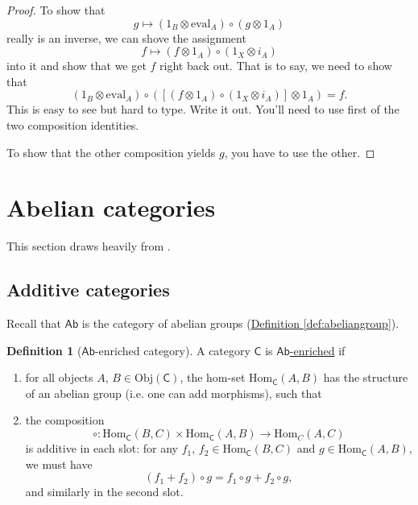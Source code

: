 \documentclass[a4paper]{report}
\newcommand{\defn}[1]{\ul{#1}}
\newcommand{\Obj}{\mathrm{Obj}}
\newcommand{\Hom}{\mathrm{Hom}}
\newcommand{\ev}{\mathrm{eval}}
\theoremstyle{definition}
\newtheorem{definition}{Definition}[section]
\theoremstyle{plain}
\theoremstyle{remark}
\begin{document}
\begin{proof}
  To show that 
  \begin{equation*}
    g \mapsto (1_{B} \otimes \ev_{A}) \circ (g \otimes 1_{A})
  \end{equation*}
  really is an inverse, we can shove the assignment
  \begin{equation*}
    f \mapsto (f \otimes 1_{A}) \circ (1_{X} \otimes i_{A})
  \end{equation*}
  into it and show that we get $f$ right back out. That is to say, we need to show that
  \begin{equation*}
    (1_{B} \otimes \ev_{A}) \circ (\left[ (f \otimes 1_{A}) \circ (1_{X} \otimes i_{A}) \right] \otimes 1_{A}) = f.
  \end{equation*}
  This is easy to see but hard to type. Write it out. You'll need to use first of the two composition identities. 

  To show that the other composition yields $g$, you have to use the other.
\end{proof} 

\section{Abelian categories} \label{sec:abeliancategories}
This section draws heavily from \cite{EGNO-tensor-categories}.
\subsection{Additive categories}
Recall that $\mathsf{Ab}$ is the category of abelian groups (\hyperref[def:abeliangroup]{Definition \ref*{def:abeliangroup}}).
\begin{definition}[$\mathsf{Ab}$-enriched category]
  \label{def:abenrichedcategory}
  A category $\mathsf{C}$ is \defn{$\mathsf{Ab}$-enriched} if 
  \begin{enumerate}
    \item for all objects $A$, $B \in \Obj(\mathsf{C})$, the hom-set $\text{Hom}_{\mathsf{C}}(A, B)$ has the structure of an abelian group (i.e. one can add morphisms), such that

    \item the composition
      \begin{equation*}
        \circ\colon \Hom_{\mathsf{C}}(B, C) \times \Hom_{\mathsf{C}}(A, B) \to \Hom_{C}(A, C)
      \end{equation*}
      is additive in each slot: for any $f_{1}$, $f_{2} \in \Hom_{\mathsf{C}}(B, C)$ and $g \in \Hom_{\mathsf{C}}(A, B)$, we must have
      \begin{equation*}
        (f_{1} + f_{2}) \circ g = f_{1} \circ g + f_{2} \circ g,
      \end{equation*}
      and similarly in the second slot.
  \end{enumerate}
\end{definition}
\end{document}
